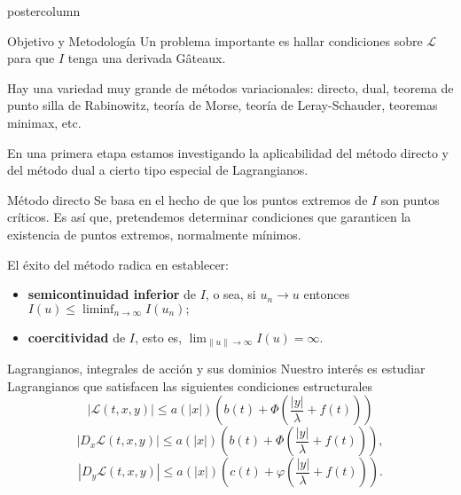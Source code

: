 \documentclass[final,hyperref={pdfpagelabels=false}]{beamer}
\begin{document}
\begin{frame}
\begin{columns}
\begin{column}{.49\textwidth}
\begin{beamercolorbox}[center,wd=\textwidth]{postercolumn}
\begin{minipage}[T]{.95\textwidth}
{\begin{block}{Objetivo y Metodología}
Un problema importante es hallar condiciones sobre $  \mathcal{L}$ para que $I$ tenga una derivada G\^ateaux.

Hay una variedad muy grande de métodos variacionales: directo,  dual, teorema de punto silla de Rabinowitz, teoría de Morse, teoría de Leray-Schauder, teoremas minimax, etc.

En una primera etapa estamos investigando la aplicabilidad del método directo y del método dual a cierto tipo especial de Lagrangianos.




 \end{block}
 \begin{block}{Método directo}
  Se basa en el hecho de que los puntos extremos de $I$ son puntos críticos. 
	Es así que, pretendemos determinar condiciones que garanticen la existencia de puntos extremos, normalmente mínimos.

 El éxito del método radica en establecer: 
\begin{itemize}
\item \textbf{semicontinuidad inferior} de $I$, o sea, si $u_n\to u$ entonces
$I(u)\leq \liminf_{n\to\infty}I(u_n);$
\item \textbf{coercitividad} de $I$, esto es,
$\lim_{\|u\|\to\infty} I(u)=\infty.$
\end{itemize}



\end{block}



   \begin{block}{Lagrangianos, integrales de acción y sus dominios}
Nuestro interés es estudiar 
Lagrangianos que satisfacen las siguientes condiciones estructurales
 \begin{equation}\label{cotaL}
                |\mathcal{L}(t,x,y)| \leq a(|x|)\left(b(t)+ \Phi\left(\frac{|y|}{\lambda}+f(t) \right)\right)
              \end{equation}
     \begin{equation}\label{cotaDxL}
|D_{x}\mathcal{L}(t,x,y)| \leq a(|x|)\left(b(t)+ \Phi\left(\frac{|y|}{\lambda}+f(t) \right)\right),
\end{equation}
  \begin{equation}\label{cotaDyL}
|D_{y}\mathcal{L}(t,x,y)| \leq a(|x|)\left(c(t)+ \varphi\left(\frac{|y|}{\lambda}+f(t)\right)  \right).
\end{equation}


\end{block}}
\end{minipage}
\end{beamercolorbox}
\end{column}
\end{columns}
\end{frame}
\end{document}
